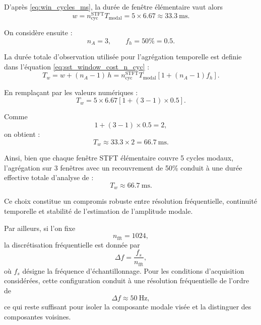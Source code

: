 \documentclass[12pt,a4paper, openany]{book}
\begin{document}
D'après \eqref{eq:win_cycles_ms}, la durée de fenêtre élémentaire vaut alors
\begin{equation}
w
=
n_{\mathrm{cyc}}^{\mathrm{STFT}}T_{\mathrm{modal}}
=
5\times6.67
\approx 33.3~\mathrm{ms}.
\label{eq:win_case}
\end{equation}

On considère ensuite :
\begin{equation}
n_A = 3,
\qquad
f_h = 50\% = 0.5.
\end{equation}

La durée totale d’observation utilisée pour l’agrégation temporelle est  definie dans l'équation \eqref{eq:sst_window_cost_n_cyc} :
\begin{equation*}
T_w = w + (n_A-1)\,h
=
n_{\mathrm{cyc}}^{\mathrm{STFT}}T_{\mathrm{modal}}
\left[1+(n_A-1)f_h\right].
\end{equation*}

En remplaçant par les valeurs numériques :
\begin{equation}
T_w
=
5\times6.67
\left[1+(3-1)\times0.5\right].
\end{equation}

Comme
\begin{equation}
1+(3-1)\times0.5 = 2,
\end{equation}
on obtient :
\begin{equation}
T_w \approx 33.3\times2 = 66.7~\mathrm{ms}.
\end{equation}

Ainsi, bien que chaque fenêtre STFT élémentaire couvre 5 cycles modaux, l’agrégation sur 3 fenêtres avec un recouvrement de 50\% conduit à une durée effective totale d’analyse de :
\begin{equation}
T_w \approx 66.7~\mathrm{ms}.
\end{equation}

Ce choix constitue un compromis robuste entre résolution fréquentielle, continuité temporelle et stabilité de l’estimation de l’amplitude modale.

Par ailleurs, si l'on fixe
\begin{equation}
n_{\mathrm{fft}} = 1024,
\end{equation}
la discrétisation fréquentielle est donnée par
\begin{equation}
\Delta f = \frac{f_s}{n_{\mathrm{fft}}},
\label{eq:delta_f_sst}
\end{equation}
où $f_s$ désigne la fréquence d'échantillonnage. Pour les conditions d'acquisition considérées, cette configuration conduit à une résolution fréquentielle de l'ordre de
\begin{equation}
\Delta f \approx 50~\mathrm{Hz},
\end{equation}
ce qui reste suffisant pour isoler la composante modale visée et la distinguer des composantes voisines.
\end{document}
